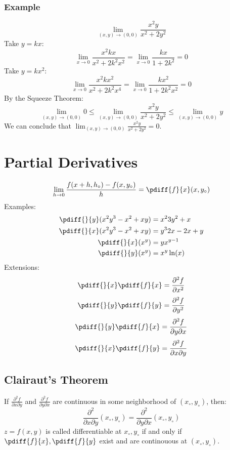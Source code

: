 \documentclass{math}
\begin{document}
\subsubsection*{Example}
\[ \lim_{(x,y)\to(0,0)}\frac{x^2y}{x^2+2y^2} \]
Take \( y = kx \):
\[ \lim_{x\to0}\frac{x^2kx}{x^2+2k^2x^2} = \lim_{x\to0}\frac{kx}{1+2k^2} = 0 \]
Take \( y = kx^2 \):
\[ \lim_{x\to0}\frac{x^2kx^2}{x^2+2k^2x^4} = \lim_{x\to0}\frac{kx^2}{1+2k^2x^2}
  = 0 \]
By the Squeeze Theorem:
\[ \lim_{(x,y)\to(0,0)}0 \le \lim_{(x,y)\to(0,0)}\frac{x^2y}{x^2+2y^2} \le
  \lim_{(x,y)\to(0,0)}y \]
We can conclude that \( \lim_{(x,y)\to(0,0)}\frac{x^2y}{x^2+2y^2} = 0 \).

\section*{Partial Derivatives}
\[ \lim_{h\to0}\frac{f(x+h,h_{\circ})-f(x,y_{\circ})}{h} =
  \pdiff{f}{x}(x,y_{\circ}) \]
Examples:
\begin{align*}
  \pdiff{}{y}(x^2y^3-x^2+xy) &= x^23y^2+x \\
  \pdiff{}{x}(x^2y^3-x^2+xy) &= y^32x-2x+y \\
  \pdiff{}{x}(x^y) &= yx^{y-1} \\
  \pdiff{}{y}(x^y) &= x^y\ln(x)
\end{align*}
Extensions:
\[ \pdiff{}{x}\pdiff{f}{x} = \frac{\partial^2{f}}{\partial{x^2}} \]
\[ \pdiff{}{y}\pdiff{f}{y} = \frac{\partial^2{f}}{\partial{y^2}} \]
\[ \pdiff{}{y}\pdiff{f}{x} = \frac{\partial^2{f}}{\partial{y}\partial{x}} \]
\[ \pdiff{}{x}\pdiff{f}{y} = \frac{\partial^2{f}}{\partial{x}\partial{y}} \]

\subsection*{Clairaut's Theorem}
If \( \frac{\partial^2{f}}{\partial{x}\partial{y}} \) and \(
\frac{\partial^2{f}}{\partial{y}\partial{x}} \) are continuous in some
neighborhood of \( (x_{\circ},y_{\circ}) \), then:
\[ \frac{\partial^2}{\partial{x}\partial{y}}(x_{\circ},y_{\circ}) =
  \frac{\partial^2}{\partial{y}\partial{x}}(x_{\circ},y_{\circ}) \]
\( z = f(x,y) \) is called differentiable at \( x_{\circ},y_{\circ} \) if and
only if \( \pdiff{f}{x},\pdiff{f}{y} \) exist and are continouous at \(
(x_{\circ},y_{\circ}) \).
\end{document}
